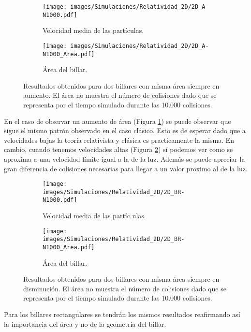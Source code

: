 \documentclass[11pt, spanish]{book}
\begin{document}
\begin{figure}[h]
    \begin{subfigure}[b]{0.5\textwidth}
        \centering
        \texttt{[image: images/Simulaciones/Relatividad\_2D/2D\_A-N1000.pdf]}
        \caption{Velocidad media de las partículas.}
    \end{subfigure}
    \hfill
    \begin{subfigure}[b]{0.5\textwidth}
        \centering
        \texttt{[image: images/Simulaciones/Relatividad\_2D/2D\_A-N1000\_Area.pdf]}
        \caption{Área del billar.}
    \end{subfigure}
    \caption{Resultados obtenidos para dos billares con misma área siempre en aumento. El área no muestra el número de colisiones dado que se representa por el tiempo simulado durante las 10.000 colisiones.}
    \label{fig:2DR_A-N1000_con_Area}
\end{figure}

En el caso de observar un aumento de área (Figura \ref{fig:2DR_A-N1000_con_Area}) se puede observar que sigue el mismo patrón observado en el caso clásico. Esto es de esperar dado que a velocidades bajas la teoría relativista y clásica es practicamente la misma. En cambio, cuando tenemos velocidades altas (Figura \ref{fig:2DR_BR-N1000_con_Area}) sí podemos ver como se aproxima a una velocidad límite igual a la de la luz. Además se puede apreciar la gran diferencia de colisiones necesarias para llegar a un valor proximo al de la luz. 

\begin{figure}[H]
    \begin{subfigure}[b]{0.5\textwidth}
        \centering
        \texttt{[image: images/Simulaciones/Relatividad\_2D/2D\_BR-N1000.pdf]}
        \caption{Velocidad media de las partíc  ulas.}
    \end{subfigure}
    \hfill
    \begin{subfigure}[b]{0.5\textwidth}
        \centering
        \texttt{[image: images/Simulaciones/Relatividad\_2D/2D\_BR-N1000\_Area.pdf]}
        \caption{Área del billar.}
    \end{subfigure}
    \caption{Resultados obtenidos para dos billares con misma área siempre en disminución. El área no muestra el número de colisiones dado que se representa por el tiempo simulado durante las 10.000 colisiones.}
    \label{fig:2DR_BR-N1000_con_Area}
\end{figure}

Para los billares rectangulares se tendrán los mismos resultados reafirmando así la importancia del área y no de la geometría del billar. 
\end{document}
